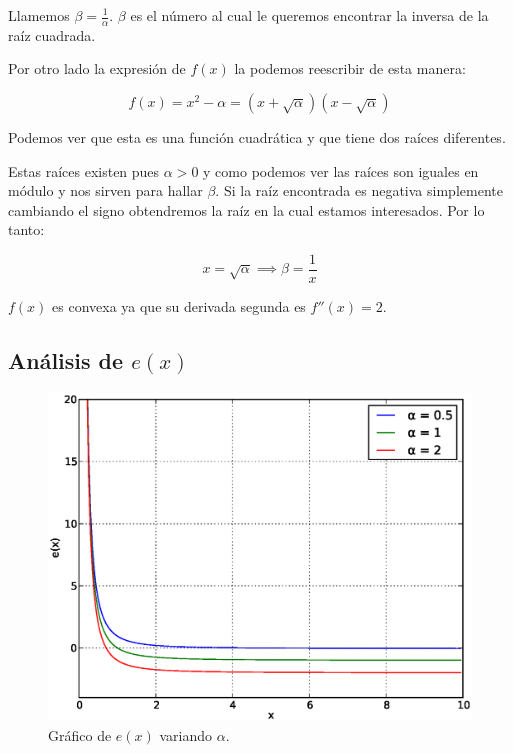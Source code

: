 Llamemos $\displaystyle \beta = \frac{ 1 }{ \alpha }$. $\beta$ es el número al
cual le queremos encontrar la inversa de la raíz cuadrada.

Por otro lado la expresión de $f(x)$ la podemos reescribir de esta manera:

\[
    f(x) = x^2 - \alpha = (x + \sqrt{\alpha})(x - \sqrt{\alpha})
\]

Podemos ver que esta es una función cuadrática y que tiene dos raíces diferentes.

Estas raíces existen pues $\alpha > 0$ y como podemos ver las raíces son
iguales en módulo y nos sirven para hallar $\beta$. Si la raíz encontrada es
negativa simplemente cambiando el signo obtendremos la raíz en la cual estamos
interesados. Por lo tanto:

\[
    x = \sqrt{\alpha} \implies \beta = \frac{ 1 }{ x }
\]

$f(x)$ es convexa ya que su derivada segunda es $f''(x) = 2$.

\subsection{Análisis de $e(x)$}\label{sec:analisis_e_x}

\begin{figure}[h]
  \begin{center}
    \includegraphics[scale=0.5]{graficos/new/e_x.eps}
    \caption{\label{fig:e_x} Gráfico de $e(x)$ variando $\alpha$.}
  \end{center}
\end{figure}

